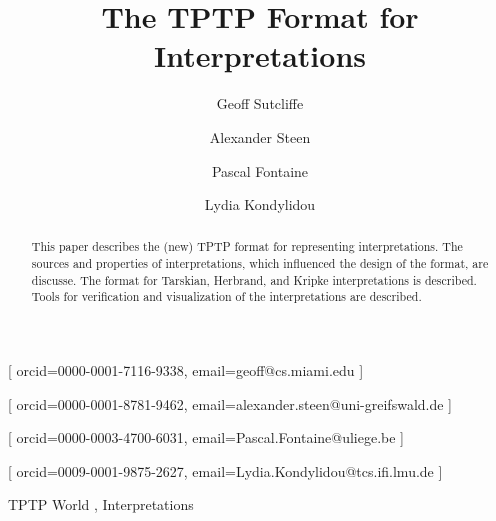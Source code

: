 \documentclass{ceurart}
\begin{document}
\title{The TPTP Format for Interpretations}

\author[1]{Geoff Sutcliffe}[%
orcid=0000-0001-7116-9338,
email=geoff@cs.miami.edu
]
\address[1]{University of Miami, USA}
\author[2]{Alexander Steen}[%
orcid=0000-0001-8781-9462,
email=alexander.steen@uni-greifswald.de
]
\address[2]{University of Greifswald, Germany}
\author[3]{Pascal Fontaine}[%
orcid=0000-0003-4700-6031,
email=Pascal.Fontaine@uliege.be
]
\address[3]{Université de Liège, Belgium}
\author[4]{Lydia Kondylidou}[%
orcid=0009-0001-9875-2627,
email=Lydia.Kondylidou@tcs.ifi.lmu.de
]
\address[4]{Ludwig-Maximilians-Universität München, Germany}

\begin{abstract}
This paper describes the (new) TPTP format for representing interpretations.
The sources and properties of interpretations, which influenced the design of the format, are
discusse.
The format for Tarskian, Herbrand, and Kripke interpretations is described.
Tools for verification and visualization of the interpretations are described.
\end{abstract}
\begin{keywords}
  TPTP World \sep
  Interpretations
\end{keywords}

\end{document}
